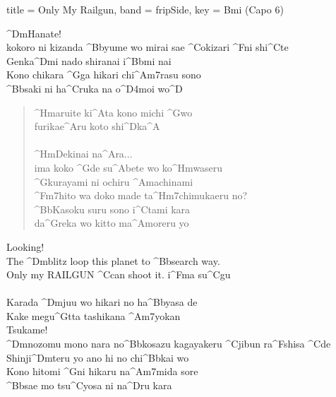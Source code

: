 \begin{song}[
	remember-chords = false ,
	verse/numbered = true ,
	transpose-capo = true 
	]{
		title = Only My Railgun,
		band = fripSide,
		key  = Bmi
	}	
	(Capo 6)
	\begin{chorus}
		
		^{Dm}Hanate! \\
		kokoro ni kizanda ^{Bb}yume wo mirai sae ^{C}okizari ^{F}ni shi^{C}te \\
		Genka^{Dm}i nado shiranai i^{Bb}mi nai \\
		Kono chikara ^{G}ga hikari chi^{Am7}rasu sono \\
		^{Bb}saki ni ha^{C}ruka na o^{D4}moi wo^{D} \\
		
	\end{chorus}
	\begin{verse}
		
		^{Hm}aruite ki^{A}ta kono michi ^{G}wo \\
		furikae^{A}ru koto shi^{D}ka^{A} \\ \\
		^{Hm}Dekinai na^{A}ra... \\
		ima koko ^{G}de su^{A}bete wo ko^{Hm}waseru \\
		
		^{G}kurayami ni ochiru ^{A}machinami \\
		^{Fm7}hito wa doko made ta^{Hm7}chimukaeru no? \\
		^{Bb}Kasoku suru sono i^{C}tami kara \\
		da^{G}reka wo kitto ma^{A}moreru yo \\
		
	\end{verse}
	\begin{chorus}
		
		Looking! \\
		The ^{Dm}blitz loop this planet to ^{Bb}search way. \\
		Only my RAILGUN ^{C}can shoot it. i^{F}ma su^{C}gu  \\ \\
		Karada ^{Dm}juu wo hikari no ha^{Bb}yasa de \\
		Kake megu^{G}tta tashikana ^{Am7}yokan \\
		
		Tsukame! \\
		^{Dm}nozomu mono nara no^{Bb}kosazu kagayakeru ^{C}jibun ra^{F}shisa ^{C}de \\
		Shinji^{Dm}teru yo ano hi no chi^{Bb}kai wo \\
		Kono hitomi ^{G}ni hikaru na^{Am7}mida sore \\
		^{Bb}sae mo tsu^{C}yosa ni na^{D}ru kara \\
	
	\end{chorus}
	
\end{song}